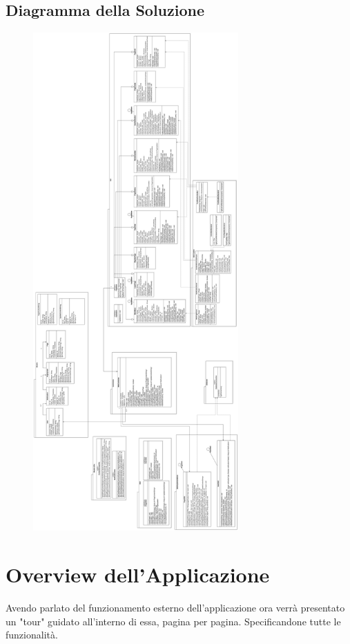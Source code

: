 \documentclass{article}
\begin{document}
	\subsection{Diagramma della Soluzione}
	\begin{figure}[htbp]
		\centering
		\includegraphics[width=0.7\textwidth,height=0.7\textheight,keepaspectratio]{solution_diagram.png}
		\label{fig:10}
	\end{figure}


	\newpage

	
	\section{Overview dell'Applicazione}
	Avendo parlato del funzionamento esterno dell'applicazione ora verr\`a presentato un "tour" guidato all'interno di essa, pagina per pagina. Specificandone tutte le funzionalit\`a.
	
\end{document}
